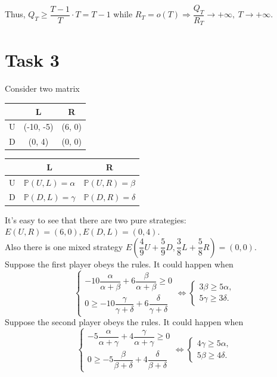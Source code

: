 \documentclass[a4paper, 12pt]{article}
\renewcommand*{\P}{\mathbb{P}}
\begin{document}
Thus, $Q_T \geqslant \dfrac{T - 1}{T} \cdot T = T-1$ while $R_T = o(T) \Rightarrow \dfrac{Q_T}{R_T} \rightarrow +\infty, ~ T \rightarrow + \infty.$

\section{Task 3}
Consider two matrix
\begin{center}
\begin{tabular}{|c|c|c|} 
\hline
& L & R\\ [0.5ex] 
\hline
U & (-10, -5) & (6, 0)\\ 
\hline
D & (0, 4) & (0, 0)\\ 
\hline
\end{tabular}
\begin{tabular}{|c|c|c|} 
\hline
& L & R\\[0.5ex]
\hline
U & $\P (U, L) = \alpha$ & $\P (U, R) = \beta$\\ 
\hline
D & $\P (D, L) = \gamma$ & $\P (D, R) = \delta$\\ 
\hline
\end{tabular}
\end{center}
It's easy to see that there are two pure strategies: $E(U, R) = (6, 0), E(D, L) = (0, 4).$\\
\noindent Also there is one mixed strategy $E \left( \dfrac{4}{9} U + \dfrac{5}{9} D, \dfrac{3}{8} L + \dfrac{5}{8} R \right) = (0, 0).$\\
\noindent Suppose the first player obeys the rules. It could happen when
$$
\begin{cases}
-10 \dfrac{\alpha}{\alpha + \beta} + 6 \dfrac{\beta}{\alpha + \beta} \geqslant 0 \\
0 \geqslant -10 \dfrac{\gamma}{\gamma + \delta} + 6 \dfrac{\delta}{\gamma + \delta}
\end{cases}
\Leftrightarrow
\begin{cases}
3 \beta \geqslant 5 \alpha, \\
5 \gamma \geqslant 3 \delta.
\end{cases}
$$
Suppose the second player obeys the rules. It could happen when
$$
\begin{cases}
-5 \dfrac{\alpha}{\alpha + \gamma} + 4 \dfrac{\gamma}{\alpha + \gamma} \geqslant 0 \\
0 \geqslant -5 \dfrac{\beta}{\beta + \delta} + 4 \dfrac{\delta}{\beta + \delta}
\end{cases}
\Leftrightarrow
\begin{cases}
4 \gamma \geqslant 5 \alpha, \\
5 \beta \geqslant 4 \delta.
\end{cases}
$$
\end{document}
